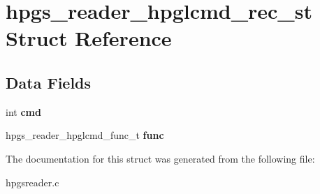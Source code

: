 \section{hpgs\_\-reader\_\-hpglcmd\_\-rec\_\-st Struct Reference}
\label{structhpgs__reader__hpglcmd__rec__st}
\subsection*{Data Fields}
\begin{DoxyCompactItemize}
\item 
int {\bfseries cmd}\label{structhpgs__reader__hpglcmd__rec__st_a56fca70dd59ca9d3aea5fa28bfc7320f}

\item 
hpgs\_\-reader\_\-hpglcmd\_\-func\_\-t {\bfseries func}\label{structhpgs__reader__hpglcmd__rec__st_ab61dd34c9bc3e14ef239fd7113800d19}

\end{DoxyCompactItemize}


The documentation for this struct was generated from the following file:\begin{DoxyCompactItemize}
\item 
hpgsreader.c\end{DoxyCompactItemize}
